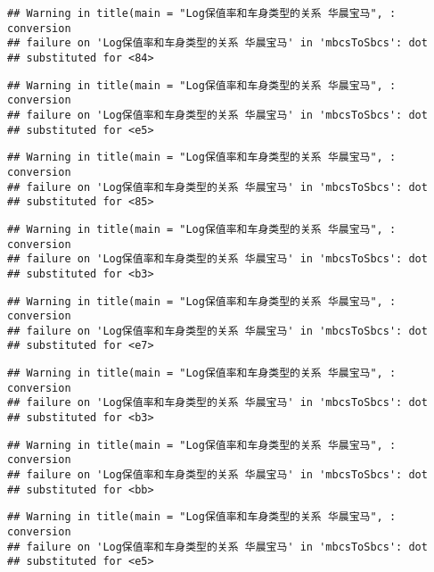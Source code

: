 \documentclass[]{article}
\begin{document}
\begin{verbatim}
## Warning in title(main = "Log保值率和车身类型的关系 华晨宝马", : conversion
## failure on 'Log保值率和车身类型的关系 华晨宝马' in 'mbcsToSbcs': dot
## substituted for <84>
\end{verbatim}

\begin{verbatim}
## Warning in title(main = "Log保值率和车身类型的关系 华晨宝马", : conversion
## failure on 'Log保值率和车身类型的关系 华晨宝马' in 'mbcsToSbcs': dot
## substituted for <e5>
\end{verbatim}

\begin{verbatim}
## Warning in title(main = "Log保值率和车身类型的关系 华晨宝马", : conversion
## failure on 'Log保值率和车身类型的关系 华晨宝马' in 'mbcsToSbcs': dot
## substituted for <85>
\end{verbatim}

\begin{verbatim}
## Warning in title(main = "Log保值率和车身类型的关系 华晨宝马", : conversion
## failure on 'Log保值率和车身类型的关系 华晨宝马' in 'mbcsToSbcs': dot
## substituted for <b3>
\end{verbatim}

\begin{verbatim}
## Warning in title(main = "Log保值率和车身类型的关系 华晨宝马", : conversion
## failure on 'Log保值率和车身类型的关系 华晨宝马' in 'mbcsToSbcs': dot
## substituted for <e7>
\end{verbatim}

\begin{verbatim}
## Warning in title(main = "Log保值率和车身类型的关系 华晨宝马", : conversion
## failure on 'Log保值率和车身类型的关系 华晨宝马' in 'mbcsToSbcs': dot
## substituted for <b3>
\end{verbatim}

\begin{verbatim}
## Warning in title(main = "Log保值率和车身类型的关系 华晨宝马", : conversion
## failure on 'Log保值率和车身类型的关系 华晨宝马' in 'mbcsToSbcs': dot
## substituted for <bb>
\end{verbatim}

\begin{verbatim}
## Warning in title(main = "Log保值率和车身类型的关系 华晨宝马", : conversion
## failure on 'Log保值率和车身类型的关系 华晨宝马' in 'mbcsToSbcs': dot
## substituted for <e5>
\end{verbatim}
\end{document}
